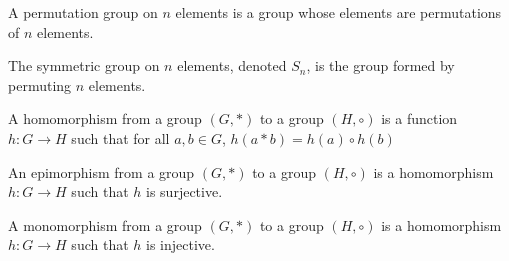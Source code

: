         \begin{definition}
            A permutation group on $n$ elements is a group whose elements are
            permutations of $n$ elements.
        \end{definition}
        \begin{definition}
            The symmetric group on $n$ elements, denoted $S_{n}$, is the group
            formed by permuting $n$ elements.
        \end{definition}
        \begin{definition}
            A homomorphism from a group $(G,*)$ to a group $(H,\circ)$ is a
            function $h:{G}\rightarrow{H}$ such that for all
            ${a,b}\in{G}$, $h(a*b)={h(a)}\circ{h(b)}$
        \end{definition}
        \begin{definition}
            An epimorphism from a group $(G,*)$ to a group $(H,\circ)$ is a
            homomorphism $h:{G}\rightarrow{H}$ such that $h$ is surjective.
        \end{definition}
        \begin{definition}
            A monomorphism from a group $(G,*)$ to a group $(H,\circ)$ is a
            homomorphism $h:{G}\rightarrow{H}$ such that $h$ is injective.
        \end{definition}